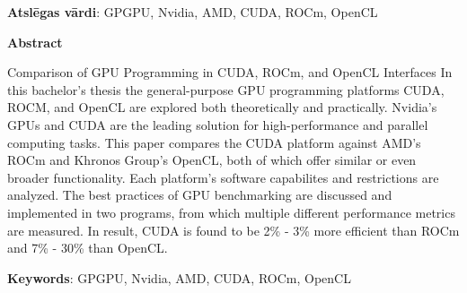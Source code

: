 \documentclass[12pt]{report}%
\theoremstyle{definition}
\begin{document}
\vspace{4mm}
\noindent \textbf{Atslēgas vārdi}: GPGPU, Nvidia, AMD, CUDA, ROCm, OpenCL

\vspace{20mm}
\noindent \textbf{Abstract}

\noindent Comparison of GPU Programming in CUDA, ROCm, and OpenCL Interfaces
\newline
In this bachelor's thesis the general-purpose GPU programming platforms CUDA,
ROCM, and OpenCL are explored both theoretically and practically. Nvidia's GPUs
and CUDA are the leading solution for high-performance and parallel computing
tasks. This paper compares the CUDA platform against AMD's ROCm and Khronos
Group's OpenCL, both of which offer similar or even broader functionality. Each
platform's software capabilites and restrictions are analyzed. The best
practices of GPU benchmarking are discussed and implemented in two programs,
from  which multiple different performance metrics are measured. In result,
CUDA is found to be  2\% - 3\% more efficient than ROCm and 7\% - 30\% than
OpenCL.

\vspace{4mm}
\noindent \textbf{Keywords}: GPGPU, Nvidia, AMD, CUDA, ROCm, OpenCL

\newpage
\tableofcontents
\newpage



\printnomenclature
\end{document}
